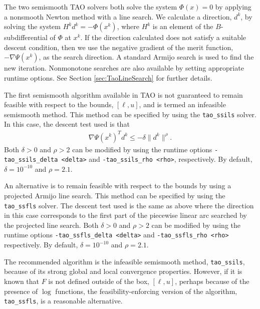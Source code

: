 The two semismooth TAO solvers both solve the system $\Phi(x) = 0$ by applying
a nonsmooth Newton method with a line search.  We calculate a direction, $d^k$,
by solving the system $H^kd^k = -\Phi(x^k)$, where $H^k$ is an element of the 
$B$-subdifferential \cite{qi.sun:nonsmooth} of $\Phi$ at $x^k$.  If the 
direction calculated does not satisfy a suitable descent condition, then 
we use the negative gradient of the merit function, $-\nabla \Psi(x^k)$, as 
the search direction.  A standard Armijo search \cite{armijo:minimization} is
used to find the new iteration.  Nonmonotone searches 
\cite{grippo.lampariello.ea:nonmonotone} are also available by setting 
appropriate runtime options.  See Section \ref{sec:TaoLineSearch} for further 
details.

The first semismooth algorithm available in TAO is not guaranteed to 
remain feasible with respect to the bounds, $[\ell, u]$, and is termed 
an infeasible semismooth method.  This method can be specified by using the 
{\tt tao\_ssils} solver.  In this case, the descent test used is 
that
\begin{eqnarray*}
\nabla \Psi(x^k)^Td^k \leq -\delta\| d^k \|^\rho.
\end{eqnarray*}
Both $\delta > 0$ and $\rho > 2$ can be modified by using the
runtime options {\tt -tao\_ssils\_delta <delta>} and 
{\tt -tao\_ssils\_rho <rho>}, respectively. By default, 
$\delta = 10^{-10}$ and $\rho = 2.1$.

An alternative is to remain feasible with respect to the bounds by using a 
projected Armijo line search.  This method can be specified by using the 
{\tt tao\_ssfls} solver.  The descent test used is the same as above 
where the direction in this case corresponds to the first part of the 
piecewise linear arc searched by the projected line search.  
Both $\delta > 0$ and $\rho > 2$ can be modified by using the runtime 
options  {\tt -tao\_ssfls\_delta <delta>} and {\tt -tao\_ssfls\_rho <rho>} 
respectively.  By default, $\delta = 10^{-10}$ and $\rho = 2.1$.

The recommended algorithm is the infeasible semismooth method,
{\tt tao\_ssils}, because of its strong global and local convergence 
properties.  However, if it is known that $F$ is not defined outside 
of the box, $[\ell,u]$, perhaps because of the presence of $\log$ functions,
the feasibility-enforcing version of the algorithm, {\tt tao\_ssfls}, is a 
reasonable alternative.

